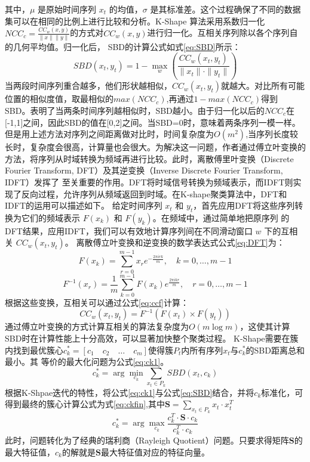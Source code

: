 其中，\( \mu \) 是原始时间序列 \( x_t \) 的均值，\( \sigma \) 是其标准差。这个过程确保了不同的数据集可以在相同的比例上进行比较和分析。K-Shape
算法采用系数归一化$NCC_c = \frac{CC_w(x,y)}{\|x\|\|y\|}$的方式对\( CC_w(x, y) \)进行归一化。互相关序列除以各个序列自的几何平均值。归一化后，
SBD的计算公式如式\eqref{eq:SBD}所示：
\begin{equation}
    SBD(x_t, y_t) = 1 - \max_w \left( \frac{CC_w(x_t, y_t)}{\|x_t\| \cdot \|y_t\|} \right)
    \label{eq:SBD}
\end{equation}
当两段时间序列重合越多，他们形状越相似，$CC_w(x_t, y_t)$就越大。对比所有可能位置的相似度值，取最相似的$max(NCC_c)$,再通过$1-max(NCC_c)$得到
SBD。表明了当两条时间序列越相似时，SBD越小。由于归一化以后的$NCC_c$在[-1,1]之间，因此SBD的值在[0,2]之间。当SBD=0时，意味着两条序列一模一样。
但是用上述方法对序列之间距离做对比时，时间复杂度为$O(m^2)$,当序列长度较长时，复杂度会很高，计算量也会很大。为解决这一问题，作者通过傅立叶变换的
方法，将序列从时域转换为频域再进行比较。此时，离散傅里叶变换（Discrete Fourier Transform, DFT）及其逆变换（Inverse Discrete Fourier Transform, IDFT）发挥了
至关重要的作用。DFT将时域信号转换为频域表示，而IDFT则实现了反向过程，允许序列从频域返回到时域。在K-shape聚类算法中，DFT和IDFT的运用可以描述如下。
给定时间序列 \( x_t \) 和 \( y_t \)，首先应用DFT将这些序列转换为它们的频域表示 \( F(x_k) \) 和 \( F(y_k) \)。在频域中，通过简单地把原序列
的DFT结果，应用IDFT，我们可以有效地计算序列间在不同滑动窗口 \( w \) 下的互相关 \( CC_w(x_t, y_t) \)。
离散傅立叶变换和逆变换的数学表达式公式\eqref{eq:DFT}为：
\begin{equation}
    F(x_k) = \sum_{r=0}^{m-1} x_r e^{-\frac{2 \pi i r k}{m}}, \quad k = 0, \ldots, m - 1
    \label{eq:DFT}
\end{equation}
\begin{equation}
    F^{-1}(x_r) = \frac{1}{m} \sum_{k=0}^{m-1} F(x_k) e^{\frac{2 \pi i k r}{m}}, \quad r = 0, \ldots, m - 1
    \label{eq:IDFT}
\end{equation}
根据这些变换，互相关可以通过公式\eqref{eq:ccf}计算：
\begin{equation}
    CC_w(x_t, y_t) = F^{-1}(F(x_t) \times F(y_t))
    \label{eq:ccf}
\end{equation}
通过傅立叶变换的方式计算互相关的算法复杂度为\( O(m \log m) \)，这使其计算SBD时在计算性能上十分高效，可以显著加快整个聚类过程。
K-Shape需要在簇内找到最优簇心$c_k^* = [c_1 \quad c_2 \quad \ldots \quad c_m]$使得簇$P_t$内所有序列$x_t$与$c_k^*$的SBD距离总和最小。其
等价的最大化问题为公式\eqref{eq:ck1}。
\begin{equation}
    c_k^* = \arg\min_{c_k} \sum_{x_t \in P_k} SBD(x_t, c_k)
    \label{eq:ck1}
\end{equation}
根据K-Shpae迭代的特性，将公式\eqref{eq:ck1}与公式\eqref{eq:SBD}结合，并将$c_k$标准化，可得到最终的簇心计算公式为式\eqref{eq:ckfin},其中$\mathbf{S} = \sum_{x_t \in P_k} x_t \cdot x_t^T$
\begin{equation}
    c_k^* = \arg\max_{c_k} \frac{c_k^T \cdot \mathbf{S} \cdot c_k}{c_k^T \cdot c_k}
    \label{eq:ckfin}
\end{equation}
此时，问题转化为了经典的瑞利商（Rayleigh Quotient）问题。只要求得矩阵$\mathbf{S}$的最大特征值，$c_k$的解就是$\mathbf{S}$最大特征值对应的特征向量。
